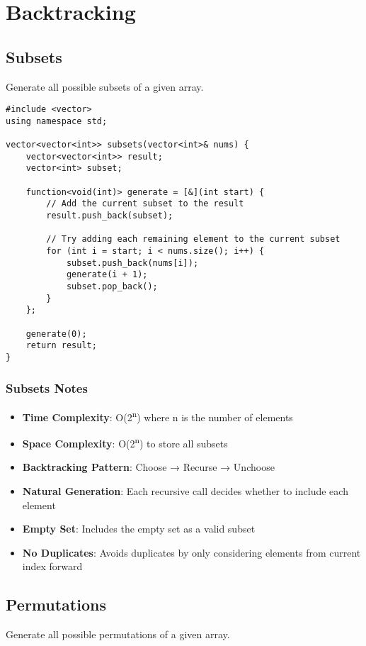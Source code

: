 \documentclass[11pt,a4paper]{article}
\begin{document}
\newpage

\section{Backtracking}

\subsection{Subsets}
Generate all possible subsets of a given array.

\begin{lstlisting}[caption={Subsets Implementation}]
#include <vector>
using namespace std;

vector<vector<int>> subsets(vector<int>& nums) {
    vector<vector<int>> result;
    vector<int> subset;
    
    function<void(int)> generate = [&](int start) {
        // Add the current subset to the result
        result.push_back(subset);
        
        // Try adding each remaining element to the current subset
        for (int i = start; i < nums.size(); i++) {
            subset.push_back(nums[i]);
            generate(i + 1);
            subset.pop_back();
        }
    };
    
    generate(0);
    return result;
}
\end{lstlisting}

\subsubsection{Subsets Notes}
\begin{itemize}
\item \textbf{Time Complexity}: O(2\textsuperscript{n}) where n is the number of elements
\item \textbf{Space Complexity}: O(2\textsuperscript{n}) to store all subsets
\item \textbf{Backtracking Pattern}: Choose → Recurse → Unchoose
\item \textbf{Natural Generation}: Each recursive call decides whether to include each element
\item \textbf{Empty Set}: Includes the empty set as a valid subset
\item \textbf{No Duplicates}: Avoids duplicates by only considering elements from current index forward
\end{itemize}

\newpage
\subsection{Permutations}
Generate all possible permutations of a given array.
\end{document}
